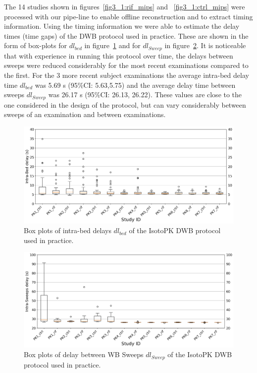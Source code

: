 The 14 studies shown in figures~\ref{fig3_1:rif_mips} and ~\ref{fig3_1:ctrl_mips} were processed with our pipe-line to enable offline reconstruction and to extract timing information. Using the timing information we were able to estimate the delay times (time gaps) of the DWB protocol used in practice. These are shown in the form of box-plots for $dl_{bed}$ in figure~\ref{fig3_1:BoxPlots_beds} and for $dl_{Sweep}$ in figure~\ref{fig3_1:BoxPlots_sweeps}.
It is noticeable that with experience in running this protocol over time, the delays between sweeps were reduced considerably for the most recent examinations compared to the first. For the 3 more recent subject examinations the average intra-bed delay time $dl_{bed}$ was 5.69 s (95\%CI: 5.63,5.75) and the average delay time between sweeps $dl_{Sweep}$ was 26.17 s (95\%CI: 26.13, 26.22).
These values are close to the one considered in the design of the protocol, but can vary considerably between sweeps of an examination and between examinations.\\
%
%
\begin{figure} [ht!]
\centering
\includegraphics[scale=0.5,angle=0]{3_Results/3_1_DWB_Optimization/figures/3_1_BoxPlots_DTBeds.png}
\caption{Box plots of intra-bed delays $dl_{bed}$ of the IsotoPK DWB protocol used in practice.} 
\label{fig3_1:BoxPlots_beds}
\end{figure}
%
\begin{figure} [ht!]
\centering
\includegraphics[scale=0.5,angle=0]{3_Results/3_1_DWB_Optimization/figures/3_1_BoxPlots_DTSweeps.png}
\caption{Box plots of delay between WB Sweeps $dl_{Sweep}$ of the IsotoPK DWB protocol used in practice.}
\label{fig3_1:BoxPlots_sweeps}
\end{figure}
%
%
